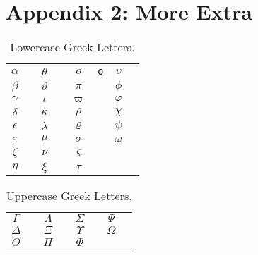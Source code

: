 \documentclass{report}
\begin{document}
\chapter*{Appendix 2: More Extra}


%
%
\newcommand{\X}[1]{$#1$&\texttt{\string#1}\hspace*{1ex}}
\newsavebox{\symbbox}
\newenvironment{symbols}[1]%
{\par\vspace*{2ex}
\begin{lrbox}{\symbbox}
\hspace*{4ex}\begin{tabular}{@{}#1@{}}}%
{\end{tabular}\end{lrbox}\makebox[\textwidth]{\usebox{\symbbox}}\par\medskip}



\begin{table}[!h]
\caption{Lowercase Greek Letters.}
\begin{symbols}{*4{cl}}
 \X{\alpha}     & \X{\theta}     & \X{o}          & \X{\upsilon}  \\
 \X{\beta}      & \X{\vartheta}  & \X{\pi}        & \X{\phi}      \\
 \X{\gamma}     & \X{\iota}      & \X{\varpi}     & \X{\varphi}   \\
 \X{\delta}     & \X{\kappa}     & \X{\rho}       & \X{\chi}      \\
 \X{\epsilon}   & \X{\lambda}    & \X{\varrho}    & \X{\psi}      \\
 \X{\varepsilon}& \X{\mu}        & \X{\sigma}     & \X{\omega}    \\
 \X{\zeta}      & \X{\nu}        & \X{\varsigma}  & &             \\
 \X{\eta}       & \X{\xi}        & \X{\tau} 
\end{symbols}
\end{table}

\begin{table}[!h]
\caption{Uppercase Greek Letters.}
\begin{symbols}{*4{cl}}
 \X{\Gamma}     & \X{\Lambda}    & \X{\Sigma}     & \X{\Psi}      \\
 \X{\Delta}     & \X{\Xi}        & \X{\Upsilon}   & \X{\Omega}    \\
 \X{\Theta}     & \X{\Pi}        & \X{\Phi} 
\end{symbols}
\end{table}
\end{document}
